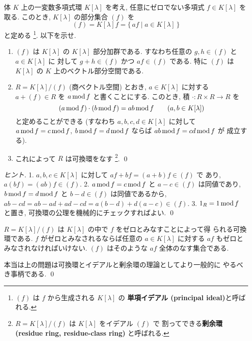 \documentclass[12pt,twoside]{jarticle}
\begin{document}

\begin{question}
  \label{q:K[x]/(f)-1}
  体 $K$ 上の一変数多項式環 $K[\lambda]$ を考え, 
  任意にゼロでない多項式 $f\in K[\lambda]$ を取る.
  このとき, $K[\lambda]$ の部分集合 $(f)$ を
  \begin{equation*}
    (f) = K[\lambda]f = \{\, af \mid a\in K[\lambda]\,\}
  \end{equation*}
  と定める%
  \footnote{$(f)$ は $f$ から生成される $K[\lambda]$ の
    {\bf 単項イデアル (principal ideal)}と呼ばれる.}.  
  以下を示せ.
  \begin{enumerate}
  \item $(f)$ は $K[\lambda]$ の $K[\lambda]$ 部分加群である.
    すなわち任意の $g,h\in (f)$ と $a\in K[\lambda]$ に
    対して $g+h\in (f)$ かつ $af\in (f)$ である.
    特に $(f)$ は $K[\lambda]$ の $K$ 上のベクトル部分空間である.
  \item $R=K[\lambda]/(f)$ (商ベクトル空間) とおき,
    $a\in K[\lambda]$ に対する $a+(f)\in R$ を $a\mathop{\mathrm{mod}}\nolimits f$ と書くことにする.
    このとき, 積 $\cdot:R\times R\to R$ を
    \begin{equation*}
      (a\mathop{\mathrm{mod}}\nolimits f)\cdot(b\mathop{\mathrm{mod}}\nolimits f) = ab\mathop{\mathrm{mod}}\nolimits f
      \qquad (a,b\in K[\lambda])
    \end{equation*}
    と定めることができる
    (すなわち $a,b,c,d\in K[\lambda]$ に対して %
    $a\mathop{\mathrm{mod}}\nolimits f=c\mathop{\mathrm{mod}}\nolimits f$, $b\mathop{\mathrm{mod}}\nolimits f=d\mathop{\mathrm{mod}}\nolimits f$ ならば $ab\mathop{\mathrm{mod}}\nolimits f=cd\mathop{\mathrm{mod}}\nolimits f$ が
    成立する).
  \item これによって $R$ は可換環をなす%
    \footnote{$R=K[\lambda]/(f)$ は $K[\lambda]$ をイデアル $(f)$ で
      割ってできる{\bf 剰余環 (residue ring, residue-class ring)} と呼ばれる.}.
    \qed
  \end{enumerate}
\end{question}

\begin{proof}[ヒント]
  1. $a,b,c\in K[\lambda]$ に対して $af+bf=(a+b)f\in(f)$ で
  あり, $a(bf) = (ab)f\in(f)$. 
  2. $a\mathop{\mathrm{mod}}\nolimits f=c\mathop{\mathrm{mod}}\nolimits f$ と $a-c\in(f)$ は同値であり,
  $b\mathop{\mathrm{mod}}\nolimits f=d\mathop{\mathrm{mod}}\nolimits f$ と $b-d\in(f)$ は同値であるから,
  $ab-cd=ab-ad+ad-cd=a(b-d)+d(a-c)\in(f)$.
  3. $1_R=1\mathop{\mathrm{mod}}\nolimits f$ と置き, 可換環の公理を機械的にチェックすればよい.
  \qed
\end{proof}

\begin{guide}
  $R=K[\lambda]/(f)$ は $K[\lambda]$ の中で $f$ をゼロとみなすことによって得
  られる可換環である.  $f$ がゼロとみなされるならば任意の $a\in K[\lambda]$ 
  に対する $af$ もゼロとみなされなければいけない.
  $(f)$ はそのような $af$ 全体のなす集合である.

  本当は上の問題は可換環とイデアルと剰余環の理論としてより一般的に
  やるべき事柄である.
  \qed
\end{guide}
\end{document}
